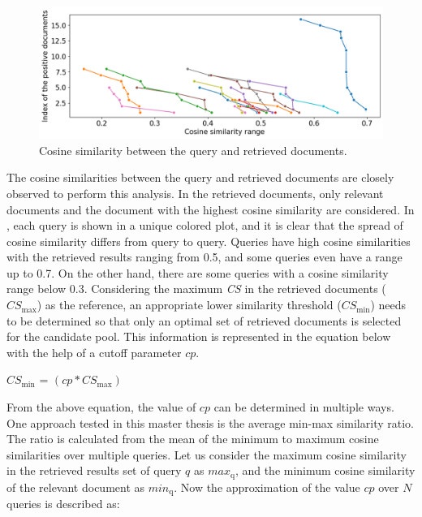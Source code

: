  
 \begin{figure}[h]
 	\centering
 	\includegraphics[width=.95\textwidth]{images/results/candidate_pool_analysis.png}
 	\caption[Cosine similarity distribution.]{Cosine similarity between the query and retrieved documents. \label{fig:cosine_sim_range}}
 \end{figure}
 
The cosine similarities between the query and retrieved documents are closely observed to perform this analysis. In the retrieved documents, only relevant documents and the document with the highest cosine similarity are considered. In , each query is shown in a unique colored plot, and it is clear that the spread of cosine similarity differs from query to query. Queries have high cosine similarities with the retrieved results ranging from 0.5, and some queries even have a range up to 0.7. On the other hand, there are some queries with a cosine similarity range below 0.3. Considering the maximum \emph{\ac{CS}} in the retrieved documents ($CS_{\mathrm{max}}$) as the reference, an appropriate lower similarity threshold ($CS_{\mathrm{min}}$) needs to be determined so that only an optimal set of retrieved documents is selected for the candidate pool. This information is represented in the equation below with the help of a cutoff parameter $cp$.
 \\
 
 	\centerline{$CS_{\mathrm{min}}$ = $( cp * CS_{\mathrm{max}} )$}
 	
 	
From the above equation, the value of $cp$ can be determined in multiple ways. One approach tested in this master thesis is the average min-max similarity ratio. The ratio is calculated from the mean of the minimum to maximum cosine similarities over multiple queries. Let us consider the maximum cosine similarity in the retrieved results set of query $q$ as $ max_{\mathrm{q}}$, and the minimum cosine similarity of the relevant document as $ min_{\mathrm{q}}$. Now the approximation of the value $cp$ over $N$ queries is described as:

